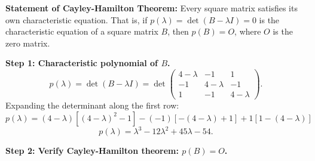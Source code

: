 \documentclass[12pt,a3paper]{article}
\begin{document}
\begin{tcolorbox}[enhanced,breakable,
  colback=cE!4,colframe=cE,boxrule=0.8pt,arc=5pt,
  title={\textbf{Answer --- Cayley-Hamilton Theorem \& $B^{-1}$}},
  fonttitle=\bfseries\color{white},colbacktitle=cE]

\textbf{Statement of Cayley-Hamilton Theorem:}
Every square matrix satisfies its own characteristic equation. That is, if $p(\lambda) = \det(B - \lambda I) = 0$ is the characteristic equation of a square matrix $B$, then $p(B) = O$, where $O$ is the zero matrix.

\medskip
\textbf{Step 1: Characteristic polynomial of $B$.}
\[
p(\lambda)=\det(B-\lambda I)=\det\begin{pmatrix}4-\lambda&-1&1\\-1&4-\lambda&-1\\1&-1&4-\lambda\end{pmatrix}.
\]
Expanding the determinant along the first row:
\[
p(\lambda) = (4-\lambda)[(4-\lambda)^2 - 1] - (-1)[-(4-\lambda) + 1] + 1[1 - (4-\lambda)]
\]
\[
\boxed{p(\lambda)=\lambda^3-12\lambda^2+45\lambda-54.}
\]

\textbf{Step 2: Verify Cayley-Hamilton theorem: $p(B)=O$.}


\end{tcolorbox}
\end{document}
